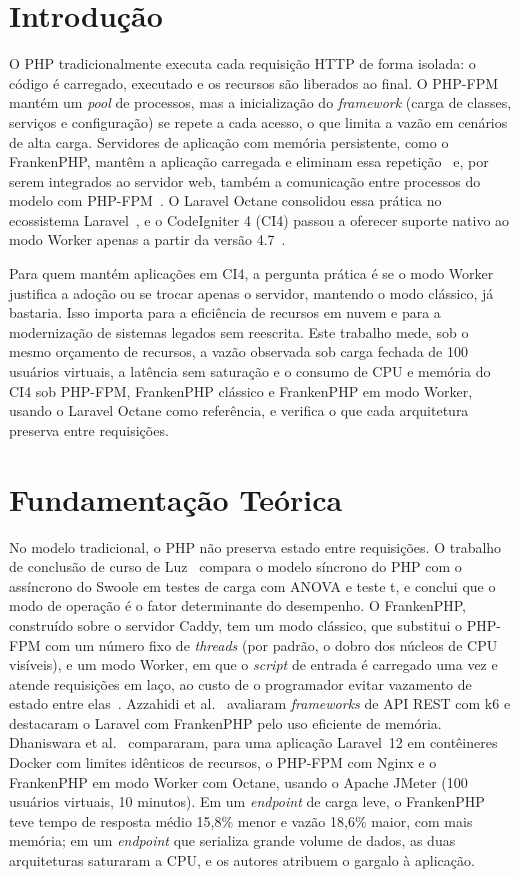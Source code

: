 \section{Introdução}
O PHP tradicionalmente executa cada requisição HTTP de forma isolada: o código é carregado, executado e os recursos são liberados ao final. O PHP-FPM mantém um \textit{pool} de processos, mas a inicialização do \textit{framework} (carga de classes, serviços e configuração) se repete a cada acesso, o que limita a vazão em cenários de alta carga. Servidores de aplicação com memória persistente, como o FrankenPHP, mantêm a aplicação carregada e eliminam essa repetição~\cite{dungalas2024} e, por serem integrados ao servidor web, também a comunicação entre processos do modelo com PHP-FPM~\cite{dhaniswara2025}. O Laravel Octane consolidou essa prática no ecossistema Laravel~\cite{otwell2024}, e o CodeIgniter 4 (CI4) passou a oferecer suporte nativo ao modo Worker apenas a partir da versão 4.7~\cite{codeigniter2024}.

Para quem mantém aplicações em CI4, a pergunta prática é se o modo Worker justifica a adoção ou se trocar apenas o servidor, mantendo o modo clássico, já bastaria. Isso importa para a eficiência de recursos em nuvem e para a modernização de sistemas legados sem reescrita. Este trabalho mede, sob o mesmo orçamento de recursos, a vazão observada sob carga fechada de 100 usuários virtuais, a latência sem saturação e o consumo de CPU e memória do CI4 sob PHP-FPM, FrankenPHP clássico e FrankenPHP em modo Worker, usando o Laravel Octane como referência, e verifica o que cada arquitetura preserva entre requisições.

\section{Fundamentação Teórica}
No modelo tradicional, o PHP não preserva estado entre requisições. O trabalho de conclusão de curso de Luz~\cite{luz2024} compara o modelo síncrono do PHP com o assíncrono do Swoole em testes de carga com ANOVA e teste t, e conclui que o modo de operação é o fator determinante do desempenho. O FrankenPHP, construído sobre o servidor Caddy, tem um modo clássico, que substitui o PHP-FPM com um número fixo de \textit{threads} (por padrão, o dobro dos núcleos de CPU visíveis), e um modo Worker, em que o \textit{script} de entrada é carregado uma vez e atende requisições em laço, ao custo de o programador evitar vazamento de estado entre elas~\cite{dungalas2024}. Azzahidi et al.~\cite{azzahidi2025} avaliaram \textit{frameworks} de API REST com k6 e destacaram o Laravel com FrankenPHP pelo uso eficiente de memória. Dhaniswara et al.~\cite{dhaniswara2025} compararam, para uma aplicação Laravel~12 em contêineres Docker com limites idênticos de recursos, o PHP-FPM com Nginx e o FrankenPHP em modo Worker com Octane, usando o Apache JMeter (100 usuários virtuais, 10 minutos). Em um \textit{endpoint} de carga leve, o FrankenPHP teve tempo de resposta médio 15,8\% menor e vazão 18,6\% maior, com mais memória; em um \textit{endpoint} que serializa grande volume de dados, as duas arquiteturas saturaram a CPU, e os autores atribuem o gargalo à aplicação.

